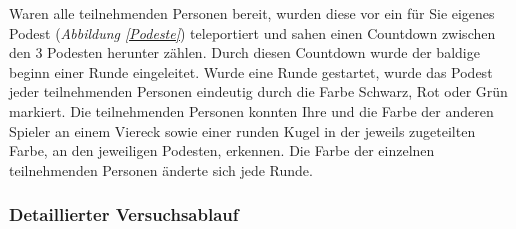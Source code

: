 \documentclass[a4paper,11pt]{article}%
\renewcommand{\\}{\vspace*{0.5\baselineskip} \newline}
\begin{document}
%

Waren alle teilnehmenden Personen bereit, wurden diese vor ein für Sie eigenes Podest (\textit{Abbildung \ref{Podeste}}) teleportiert und sahen einen Countdown zwischen den 3 Podesten herunter zählen. Durch diesen Countdown wurde der baldige beginn einer Runde eingeleitet.
Wurde eine Runde gestartet, wurde das Podest jeder teilnehmenden Personen eindeutig durch die Farbe \dq{}Schwarz, Rot oder Grün\dq{} markiert. Die teilnehmenden Personen konnten Ihre und die Farbe der anderen Spieler an einem Viereck sowie einer runden Kugel in der jeweils zugeteilten Farbe, an den jeweiligen Podesten, erkennen. Die Farbe der einzelnen teilnehmenden Personen änderte sich jede Runde.

	\subsubsection{Detaillierter Versuchsablauf}
\end{document}
